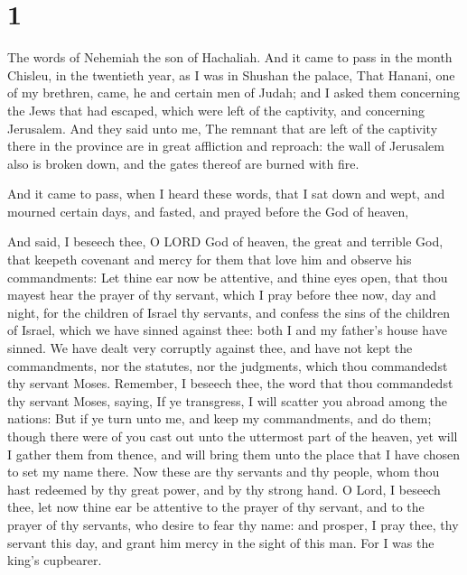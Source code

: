 \hypertarget{section}{%
\section{1}\label{section}}

 The words of Nehemiah the son of Hachaliah. And it came to
pass in the month Chisleu, in the twentieth year, as I was in Shushan
the palace,  That Hanani, one of my brethren, came, he and
certain men of Judah; and I asked them concerning the Jews that had
escaped, which were left of the captivity, and concerning Jerusalem.
 And they said unto me, The remnant that are left of the
captivity there in the province are in great affliction and reproach:
the wall of Jerusalem also is broken down, and the gates thereof are
burned with fire.

 And it came to pass, when I heard these words, that I sat
down and wept, and mourned certain days, and fasted, and prayed before
the God of heaven,

 And said, I beseech thee, O LORD God of heaven, the great
and terrible God, that keepeth covenant and mercy for them that love him
and observe his commandments:  Let thine ear now be
attentive, and thine eyes open, that thou mayest hear the prayer of thy
servant, which I pray before thee now, day and night, for the children
of Israel thy servants, and confess the sins of the children of Israel,
which we have sinned against thee: both I and my father's house have
sinned.  We have dealt very corruptly against thee, and have
not kept the commandments, nor the statutes, nor the judgments, which
thou commandedst thy servant Moses.  Remember, I beseech
thee, the word that thou commandedst thy servant Moses, saying, If ye
transgress, I will scatter you abroad among the nations: 
But if ye turn unto me, and keep my commandments, and do them; though
there were of you cast out unto the uttermost part of the heaven, yet
will I gather them from thence, and will bring them unto the place that
I have chosen to set my name there.  Now these are thy
servants and thy people, whom thou hast redeemed by thy great power, and
by thy strong hand.  O Lord, I beseech thee, let now thine
ear be attentive to the prayer of thy servant, and to the prayer of thy
servants, who desire to fear thy name: and prosper, I pray thee, thy
servant this day, and grant him mercy in the sight of this man. For I
was the king's cupbearer.


